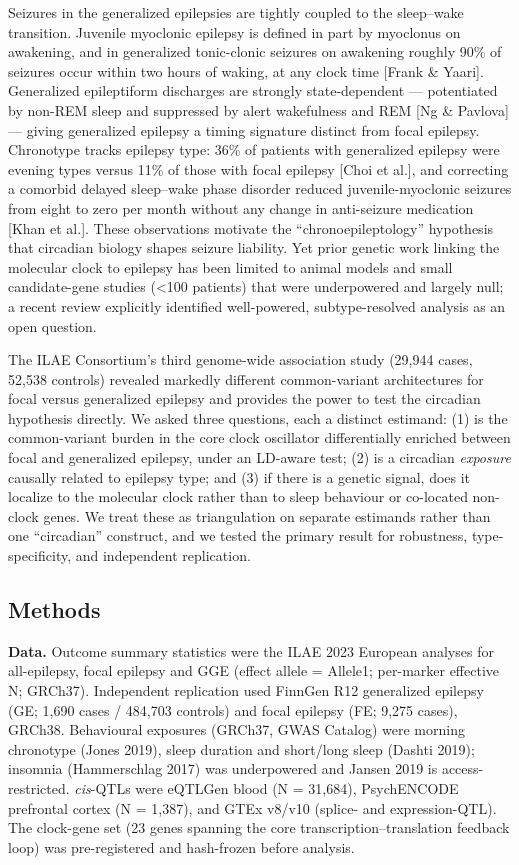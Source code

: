 \documentclass[
]{article}
\begin{document}
Seizures in the generalized epilepsies are tightly coupled to the
sleep--wake transition. Juvenile myoclonic epilepsy is defined in part
by myoclonus on awakening, and in generalized tonic-clonic seizures on
awakening roughly 90\% of seizures occur within two hours of waking, at
any clock time {[}Frank \& Yaari{]}. Generalized epileptiform discharges
are strongly state-dependent --- potentiated by non-REM sleep and
suppressed by alert wakefulness and REM {[}Ng \& Pavlova{]} --- giving
generalized epilepsy a timing signature distinct from focal epilepsy.
Chronotype tracks epilepsy type: 36\% of patients with generalized
epilepsy were evening types versus 11\% of those with focal epilepsy
{[}Choi et al.{]}, and correcting a comorbid delayed sleep--wake phase
disorder reduced juvenile-myoclonic seizures from eight to zero per
month without any change in anti-seizure medication {[}Khan et al.{]}.
These observations motivate the ``chronoepileptology'' hypothesis that
circadian biology shapes seizure liability. Yet prior genetic work
linking the molecular clock to epilepsy has been limited to animal
models and small candidate-gene studies (\textless100 patients) that
were underpowered and largely null; a recent review explicitly
identified well-powered, subtype-resolved analysis as an open question.

The ILAE Consortium's third genome-wide association study (29,944 cases,
52,538 controls) revealed markedly different common-variant
architectures for focal versus generalized epilepsy and provides the
power to test the circadian hypothesis directly. We asked three
questions, each a distinct estimand: (1) is the common-variant burden in
the core clock oscillator differentially enriched between focal and
generalized epilepsy, under an LD-aware test; (2) is a circadian
\emph{exposure} causally related to epilepsy type; and (3) if there is a
genetic signal, does it localize to the molecular clock rather than to
sleep behaviour or co-located non-clock genes. We treat these as
triangulation on separate estimands rather than one ``circadian''
construct, and we tested the primary result for robustness,
type-specificity, and independent replication.

\subsection{Methods}\label{methods}

\textbf{Data.} Outcome summary statistics were the ILAE 2023 European
analyses for all-epilepsy, focal epilepsy and GGE (effect allele =
Allele1; per-marker effective N; GRCh37). Independent replication used
FinnGen R12 generalized epilepsy (GE; 1,690 cases / 484,703 controls)
and focal epilepsy (FE; 9,275 cases), GRCh38. Behavioural exposures
(GRCh37, GWAS Catalog) were morning chronotype (Jones 2019), sleep
duration and short/long sleep (Dashti 2019); insomnia (Hammerschlag
2017) was underpowered and Jansen 2019 is access-restricted.
\emph{cis}-QTLs were eQTLGen blood (N = 31,684), PsychENCODE prefrontal
cortex (N = 1,387), and GTEx v8/v10 (splice- and expression-QTL). The
clock-gene set (23 genes spanning the core transcription--translation
feedback loop) was pre-registered and hash-frozen before analysis.
\end{document}
